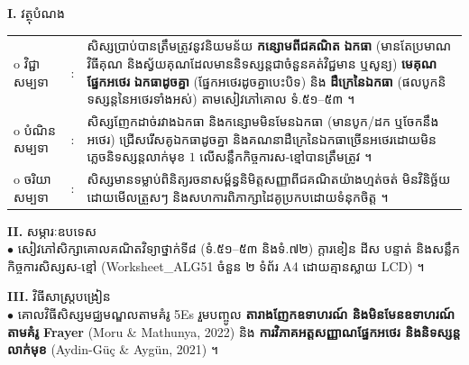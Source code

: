 \documentclass[a4paper,10pt]{article}
\newcommand{\wcirc}{{\CourierBullet\fontsize{9.5pt}{11pt}\selectfont o}}
\newcommand{\en}[1]{{\TimesEn #1}}
\begin{document}
\textbf{I.} {\muol វត្ថុបំណង}\\[1pt]
\hspace*{0.55cm}%
\begin{tabular}{@{}l l L{14.2cm}@{}}
  \wcirc \hspace{0.25cm} វិជ្ជាសម្បទា & : & សិស្សប្រាប់បានត្រឹមត្រូវនូវនិយមន័យ \textbf{កន្សោមពីជគណិត} \textbf{ឯកធា} (មានតែប្រមាណវិធីគុណ និងស្វ័យគុណដែលមាននិទស្សន្តជាចំនួនគត់វិជ្ជមាន ឬសូន្យ) \textbf{មេគុណ} \textbf{ផ្នែកអថេរ} \textbf{ឯកធាដូចគ្នា} (ផ្នែកអថេរដូចគ្នាបេះបិទ) និង \textbf{ដឺក្រេនៃឯកធា} (ផលបូកនិទស្សន្តនៃអថេរទាំងអស់) តាមសៀវភៅគោល ទំ.៥១--៥៣ ។ \\
  \wcirc \hspace{0.25cm} បំណិនសម្បទា & : & សិស្សញែកដាច់រវាងឯកធា និងកន្សោមមិនមែនឯកធា (មានបូក/ដក ឬចែកនឹងអថេរ) ជ្រើសរើសគូឯកធាដូចគ្នា និងគណនាដឺក្រេនៃឯកធាច្រើនអថេរដោយមិនភ្លេចនិទស្សន្តលាក់មុខ $1$ លើសន្លឹកកិច្ចការស-ខ្មៅបានត្រឹមត្រូវ ។ \\
  \wcirc \hspace{0.25cm} ចរិយាសម្បទា & : & សិស្សមានទម្លាប់ពិនិត្យរចនាសម្ព័ន្ធនិមិត្តសញ្ញាពីជគណិតយ៉ាងហ្មត់ចត់ មិនវិនិច្ឆ័យដោយមើលត្រួសៗ និងសហការពិភាក្សាដៃគូប្រកបដោយទំនុកចិត្ត ។ \\
\end{tabular}

\vspace{1pt}

\textbf{II.} {\muol សម្ភារៈឧបទេស}\\[1pt]
\hspace*{0.55cm}$\bullet$ \hspace{0.35cm} សៀវភៅសិក្សាគោលគណិតវិទ្យាថ្នាក់ទី៨ (ទំ.៥១--៥៣ និងទំ.៧២) ក្ដារខៀន ដីស បន្ទាត់ និងសន្លឹកកិច្ចការសិស្សស-ខ្មៅ (\en{Worksheet\_ALG51} ចំនួន ២ ទំព័រ \en{A4} ដោយគ្មានស្លាយ \en{LCD}) ។

\vspace{1pt}

\textbf{III.} {\muol វិធីសាស្រ្តបង្រៀន}\\[1pt]
\hspace*{0.55cm}$\bullet$ \hspace{0.35cm} គោលវិធីសិស្សមជ្ឈមណ្ឌលតាមគំរូ \en{5Es} រួមបញ្ចូល \textbf{តារាងញែកឧទាហរណ៍ និងមិនមែនឧទាហរណ៍តាមគំរូ \en{Frayer}} (\en{Moru \& Mathunya, 2022}) និង \textbf{ការវិភាគអត្តសញ្ញាណផ្នែកអថេរ និងនិទស្សន្តលាក់មុខ} (\en{Aydin-G\"u\c{c} \& Ayg\"un, 2021}) ។

\vspace{2pt}
\end{document}

